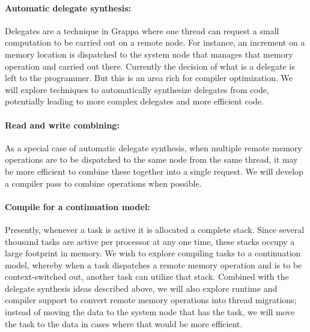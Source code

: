 \paragraph{Automatic delegate synthesis: } Delegates are a technique in Grappa where one thread can request a small computation to be carried out on a remote node.  For instance, an increment on a memory location is dispatched to the system node that manages that memory operation and carried out there.  Currently the decision of what is a delegate is left to the programmer.  But this is an area rich for compiler optimization.  We will explore techniques to automatically synthesize delegates from code, potentially leading to more complex delegates and more efficient code.

\paragraph{Read and write combining: } As a special case of automatic delegate synthesis, when multiple remote memory operations are to be dispatched to the same node from the same thread, it may be more efficient to combine these together into a single request.  We will develop a compiler pass to combine operations when possible.

\paragraph{Compile for a continuation model: } Presently, whenever a task is active it is allocated a complete stack.  Since several thousand tasks are active per processor at any one time, these stacks occupy a large footprint in memory.  We wish to explore compiling tasks to a continuation model, whereby when a task dispatches a remote memory operation and is to be context-switched out, another task can utilize that stack.  Combined with the delegate synthesis ideas described above, we will also explore runtime and compiler support to convert remote memory operations into thread migrations; instead of moving the data to the system node that has the task, we will move the task to the data in cases where that would be more efficient.

